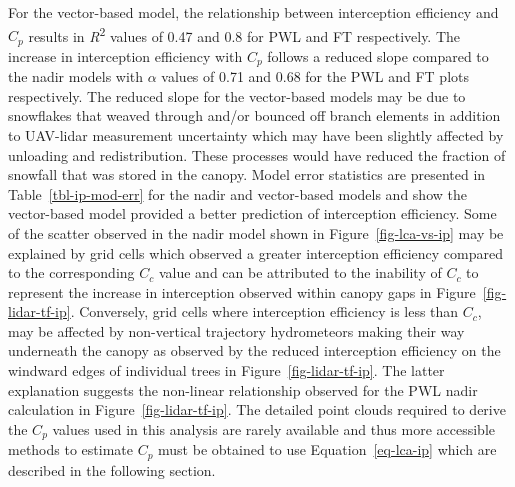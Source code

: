 \documentclass[
  letterpaper,
  DIV=11,
  numbers=noendperiod]{scrartcl}
\begin{document}
For the vector-based model, the relationship between interception
efficiency and \(C_p\) results in \emph{R}\textsuperscript{2} values of
0.47 and 0.8 for PWL and FT respectively. The increase in interception
efficiency with \(C_p\) follows a reduced slope compared to the nadir
models with \(\alpha\) values of 0.71 and 0.68 for the PWL and FT plots
respectively. The reduced slope for the vector-based models may be due
to snowflakes that weaved through and/or bounced off branch elements in
addition to UAV-lidar measurement uncertainty which may have been
slightly affected by unloading and redistribution. These processes would
have reduced the fraction of snowfall that was stored in the canopy.
Model error statistics are presented in Table~\ref{tbl-ip-mod-err} for
the nadir and vector-based models and show the vector-based model
provided a better prediction of interception efficiency. Some of the
scatter observed in the nadir model shown in Figure~\ref{fig-lca-vs-ip}
may be explained by grid cells which observed a greater interception
efficiency compared to the corresponding \(C_c\) value and can be
attributed to the inability of \(C_c\) to represent the increase in
interception observed within canopy gaps in
Figure~\ref{fig-lidar-tf-ip}. Conversely, grid cells where interception
efficiency is less than \(C_c\), may be affected by non-vertical
trajectory hydrometeors making their way underneath the canopy as
observed by the reduced interception efficiency on the windward edges of
individual trees in Figure~\ref{fig-lidar-tf-ip}. The latter explanation
suggests the non-linear relationship observed for the PWL nadir
calculation in Figure~\ref{fig-lidar-tf-ip}. The detailed point clouds
required to derive the \(C_p\) values used in this analysis are rarely
available and thus more accessible methods to estimate \(C_p\) must be
obtained to use Equation~\ref{eq-lca-ip} which are described in the
following section.
\end{document}
